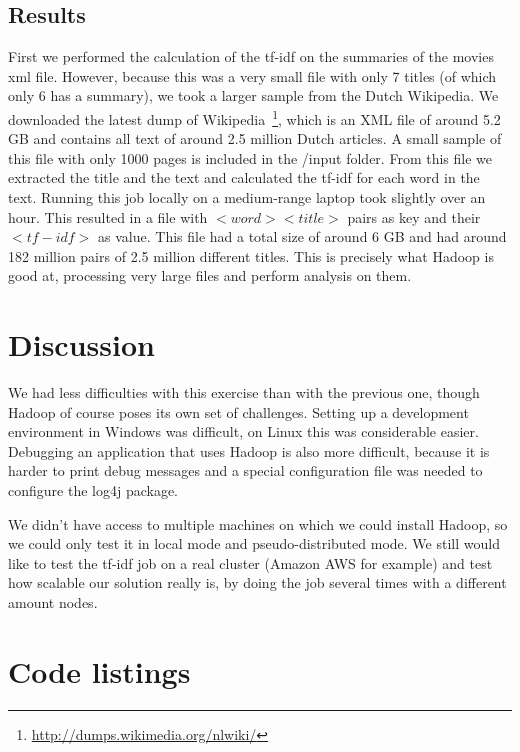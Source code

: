 \documentclass[11pt]{article}
\begin{document}
\subsection{Results}
First we performed the calculation of the tf-idf on the summaries of the movies xml file. However, because this was a very small file with only 7 titles (of which only 6 has a summary), we took a larger sample from the Dutch Wikipedia. We downloaded the latest dump of Wikipedia~\footnote{\url{http://dumps.wikimedia.org/nlwiki/}}, which is an XML file of around 5.2 GB and contains all text of around 2.5 million Dutch articles. A small sample of this file with only 1000 pages is included in the /input folder. From this file we extracted the title and the text and calculated the tf-idf for each word in the text. Running this job locally on a medium-range laptop took slightly over an hour. This resulted in a file with $<word><title>$ pairs as key and their $<tf-idf>$ as value. This file had a total size of around 6 GB and had around 182 million pairs of 2.5 million different titles. This is precisely what Hadoop is good at, processing very large files and perform analysis on them.

\section{Discussion}
We had less difficulties with this exercise than with the previous one, though Hadoop of course poses its own set of challenges. Setting up a development environment in Windows was difficult, on Linux this was considerable easier. Debugging an application that uses Hadoop is also more difficult, because it is harder to print debug messages and a special configuration file was needed to configure the log4j package.

We didn't have access to multiple machines on which we could install Hadoop, so we could only test it in local mode and pseudo-distributed mode. We still would like to test the tf-idf job on a real cluster (Amazon AWS for example) and test how scalable our solution really is, by doing the job several times with a different amount nodes.

\section{Code listings}





\end{document}
